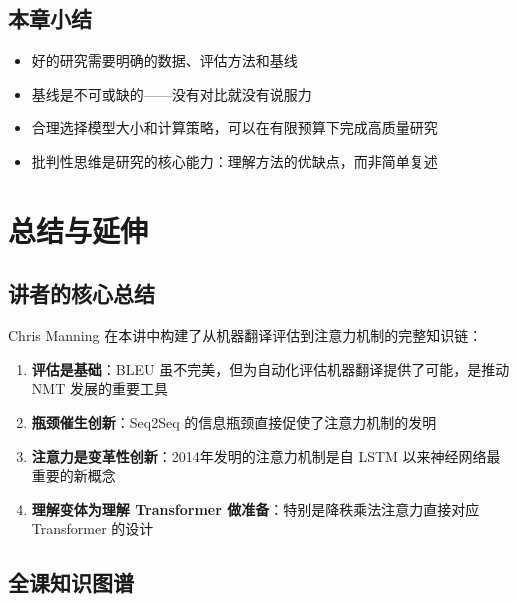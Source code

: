 \documentclass[a4paper]{article}
\begin{document}
\subsection{本章小结}

\begin{itemize}
    \item 好的研究需要明确的数据、评估方法和基线
    \item 基线是不可或缺的——没有对比就没有说服力
    \item 合理选择模型大小和计算策略，可以在有限预算下完成高质量研究
    \item 批判性思维是研究的核心能力：理解方法的优缺点，而非简单复述
\end{itemize}


\section{总结与延伸}

\subsection{讲者的核心总结}

Chris Manning 在本讲中构建了从机器翻译评估到注意力机制的完整知识链：

\begin{enumerate}
    \item \textbf{评估是基础}：BLEU 虽不完美，但为自动化评估机器翻译提供了可能，是推动 NMT 发展的重要工具
    \item \textbf{瓶颈催生创新}：Seq2Seq 的信息瓶颈直接促使了注意力机制的发明
    \item \textbf{注意力是变革性创新}：2014年发明的注意力机制是自 LSTM 以来神经网络最重要的新概念
    \item \textbf{理解变体为理解 Transformer 做准备}：特别是降秩乘法注意力直接对应 Transformer 的设计
\end{enumerate}

\subsection{全课知识图谱}
\end{document}
